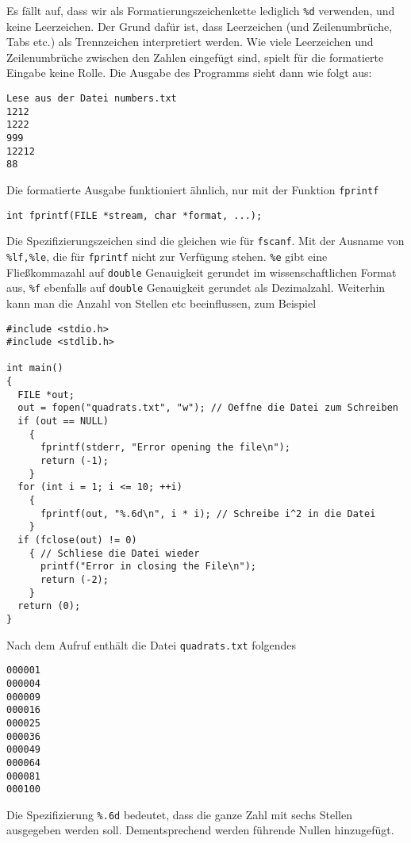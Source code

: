 Es fällt auf, dass wir als Formatierungszeichenkette lediglich \verb|%d| verwenden, und keine Leerzeichen.
Der Grund dafür ist, dass Leerzeichen (und Zeilenumbrüche, Tabs etc.) als Trennzeichen interpretiert werden.
Wie viele Leerzeichen und Zeilenumbrüche zwischen den Zahlen eingefügt sind, spielt für die formatierte Eingabe keine Rolle.
Die Ausgabe des Programms sieht dann wie folgt aus:
\begin{verbatim}
Lese aus der Datei numbers.txt
1212
1222
999
12212
88
\end{verbatim}
Die formatierte Ausgabe funktioniert ähnlich, nur mit der Funktion \verb|fprintf|
\begin{lstlisting}
int fprintf(FILE *stream, char *format, ...);
\end{lstlisting}
Die Spezifizierungszeichen sind die gleichen wie für \verb|fscanf|.
Mit der Ausname von \verb|%lf,%le|, die für \verb|fprintf| nicht zur Verfügung stehen.
\verb|%e| gibt eine Fließkommazahl auf \verb|double| Genauigkeit gerundet im wissenschaftlichen Format aus, \verb|%f| ebenfalls auf \verb|double| Genauigkeit gerundet als Dezimalzahl.
Weiterhin kann man die Anzahl von Stellen etc beeinflussen, zum Beispiel
\begin{lstlisting}
#include <stdio.h>
#include <stdlib.h>

int main()
{
  FILE *out;
  out = fopen("quadrats.txt", "w"); // Oeffne die Datei zum Schreiben
  if (out == NULL)
    {
      fprintf(stderr, "Error opening the file\n");
      return (-1);
    }
  for (int i = 1; i <= 10; ++i)
    {
      fprintf(out, "%.6d\n", i * i); // Schreibe i^2 in die Datei
    }
  if (fclose(out) != 0)
    { // Schliese die Datei wieder
      printf("Error in closing the File\n");
      return (-2);
    }
  return (0);
}
\end{lstlisting}
Nach dem Aufruf enthält die Datei \verb|quadrats.txt| folgendes
\begin{verbatim}
000001
000004
000009
000016
000025
000036
000049
000064
000081
000100
\end{verbatim}
Die Spezifizierung \verb|%.6d| bedeutet, dass die ganze Zahl mit sechs Stellen ausgegeben werden soll.
Dementsprechend werden führende Nullen hinzugefügt.

